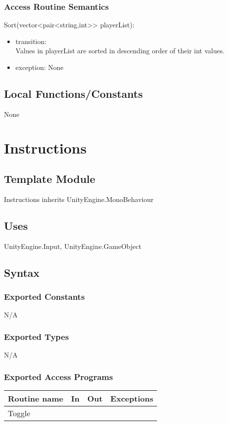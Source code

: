 \documentclass[12pt]{article}
\begin{document}
\subsubsection{Access Routine Semantics}
\noindent Sort(vector<pair<string,int>> playerList):
\begin{itemize}
	\item transition:\\
	    Values in playerList are sorted in descending order of their int values.
	\item exception: None
\end{itemize}

\subsection{Local Functions/Constants}
None

\newpage

\section{Instructions}

\subsection{Template Module}
Instructions inherits UnityEngine.MonoBehaviour

\subsection{Uses}
UnityEngine.Input, UnityEngine.GameObject

\subsection{Syntax}
\subsubsection{Exported Constants}
N/A
\subsubsection{Exported Types}
N/A
\subsubsection{Exported Access Programs}
\begin{tabular}{| l | l | l | l |}
\hline
\textbf{Routine name} & \textbf{In} & \textbf{Out} & \textbf{Exceptions}\\
\hline
Toggle   &     &           &          \\
\hline
\end{tabular}
\end{document}
